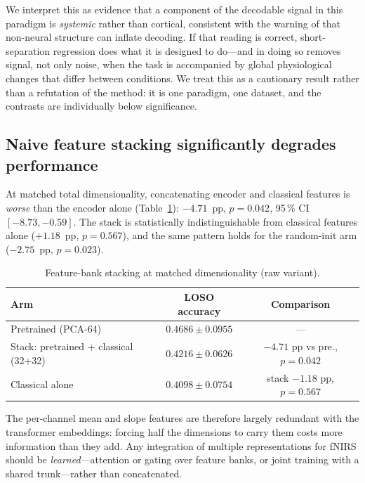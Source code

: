 We interpret this as evidence that a component of the decodable signal in this paradigm is
\emph{systemic} rather than cortical, consistent with the warning of \citet{rybar2024cue} that
non-neural structure can inflate decoding. If that reading is correct, short-separation
regression does what it is designed to do---and in doing so removes signal, not only noise, when
the task is accompanied by global physiological changes that differ between conditions. We treat
this as a cautionary result rather than a refutation of the method: it is one paradigm, one
dataset, and the contrasts are individually below significance.

\subsection{Naive feature stacking significantly degrades performance}
\label{sec:results_stack}

At matched total dimensionality, concatenating encoder and classical features is
\emph{worse} than the encoder alone (Table~\ref{tab:stack}): $-4.71$~pp, $p = 0.042$, 95\,\% CI
$[-8.73, -0.59]$. The stack is statistically indistinguishable from classical features alone
($+1.18$~pp, $p = 0.567$), and the same pattern holds for the random-init arm
($-2.75$~pp, $p = 0.023$).

\begin{table}[t]
\centering
\caption{Feature-bank stacking at matched dimensionality (raw variant).}
\label{tab:stack}
\begin{tabular}{lcc}
\toprule
Arm & LOSO accuracy & Comparison \\
\midrule
Pretrained (PCA-64) & $\mathbf{0.4686 \pm 0.0955}$ & --- \\
Stack: pretrained + classical (32+32) & $0.4216 \pm 0.0626$ & $-4.71$ pp vs pre., $p=0.042$ \\
Classical alone & $0.4098 \pm 0.0754$ & stack $-1.18$ pp, $p=0.567$ \\
\bottomrule
\end{tabular}
\end{table}

The per-channel mean and slope features are therefore largely redundant with the transformer
embeddings: forcing half the dimensions to carry them costs more information than they add. Any
integration of multiple representations for fNIRS should be \emph{learned}---attention or gating
over feature banks, or joint training with a shared trunk---rather than concatenated.

